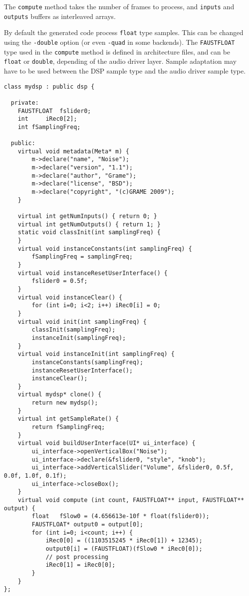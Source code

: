 The \lstinline'compute'  method takes the number of frames to process, and \lstinline'inputs' and \lstinline'outputs'  buffers as interleaved arrays.

By default the generated code process  \lstinline'float'  type samples. This can be changed using the \lstinline'-double' option (or  even \lstinline'-quad' in some backends). The \lstinline'FAUSTFLOAT' type used in the \lstinline'compute' method is defined in architecture files, and can be \lstinline'float' or \lstinline'double', depending of the audio driver layer. Sample adaptation may have to be used between the DSP sample type and the audio driver sample type.

\begin{lstlisting}[basicstyle=\ttfamily\footnotesize\color{yotxt}]
class mydsp : public dsp {

  private:
	FAUSTFLOAT 	fslider0;
	int 	iRec0[2];
	int fSamplingFreq;

  public:
	virtual void metadata(Meta* m) { 
		m->declare("name", "Noise");
		m->declare("version", "1.1");
		m->declare("author", "Grame");
		m->declare("license", "BSD");
		m->declare("copyright", "(c)GRAME 2009");
	}

	virtual int getNumInputs() { return 0; }
	virtual int getNumOutputs() { return 1; }
	static void classInit(int samplingFreq) {
	}
	virtual void instanceConstants(int samplingFreq) {
		fSamplingFreq = samplingFreq;
	}
	virtual void instanceResetUserInterface() {
		fslider0 = 0.5f;
	}
	virtual void instanceClear() {
		for (int i=0; i<2; i++) iRec0[i] = 0;
	}
	virtual void init(int samplingFreq) {
		classInit(samplingFreq);
		instanceInit(samplingFreq);
	}
	virtual void instanceInit(int samplingFreq) {
		instanceConstants(samplingFreq);
		instanceResetUserInterface();
		instanceClear();
	}
	virtual mydsp* clone() {
		return new mydsp();
	}
	virtual int getSampleRate() {
		return fSamplingFreq;
	}
	virtual void buildUserInterface(UI* ui_interface) {
		ui_interface->openVerticalBox("Noise");
		ui_interface->declare(&fslider0, "style", "knob");
		ui_interface->addVerticalSlider("Volume", &fslider0, 0.5f, 0.0f, 1.0f, 0.1f);
		ui_interface->closeBox();
	}
	virtual void compute (int count, FAUSTFLOAT** input, FAUSTFLOAT** output) {
		float 	fSlow0 = (4.656613e-10f * float(fslider0));
		FAUSTFLOAT* output0 = output[0];
		for (int i=0; i<count; i++) {
			iRec0[0] = ((1103515245 * iRec0[1]) + 12345);
			output0[i] = (FAUSTFLOAT)(fSlow0 * iRec0[0]);
			// post processing
			iRec0[1] = iRec0[0];
		}
	}
};
\end{lstlisting} 

